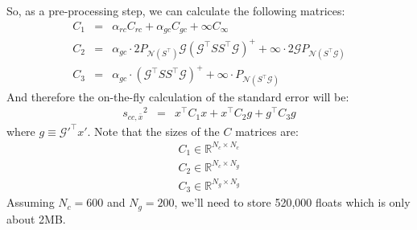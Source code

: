 \documentclass[11pt]{article}
\newcommand{\Gmat}{\mathcal{G}}
\newcommand{\PNmat}[1]{P_{\mathcal{N}\left(#1\right)}}
\begin{document}
So, as a pre-processing step, we can calculate the following matrices:
\begin{eqnarray}
	C_1 &=& \alpha_{rc} C_{rc} + \alpha_{gc} C_{gc} + \infty C_\infty \\
	C_2 &=& \alpha_{gc} \cdot 2 \PNmat{S^\top} \Gmat \left(\Gmat^{\top}SS^{\top}\Gmat\right)^{+} + \infty \cdot 2 \Gmat \PNmat{S^\top\Gmat} \\
	C_3 &=& \alpha_{gc} \cdot \left(\Gmat^{\top}SS^{\top}\Gmat\right)^{+} + \infty \cdot \PNmat{S^\top\Gmat} 
\end{eqnarray}
And therefore the on-the-fly calculation of the standard error will be:
\begin{eqnarray}
	{s_{cc,\bar{x}}}^2 &=& x^\top C_1 x + x^\top C_2 g + g^\top C_3 g
\end{eqnarray}
where $g \equiv \Gmat'^\top x'$. Note that the sizes of the $C$ matrices are:
\begin{eqnarray}
	C_1 \in \mathbb{R}^{N_c \times N_c} \\
	C_2 \in \mathbb{R}^{N_c \times N_g} \\
	C_3 \in \mathbb{R}^{N_g \times N_g}
\end{eqnarray}
Assuming $N_c = 600$ and $N_g = 200$, we'll need to store 520,000 floats which is only about 2MB.
\end{document}
